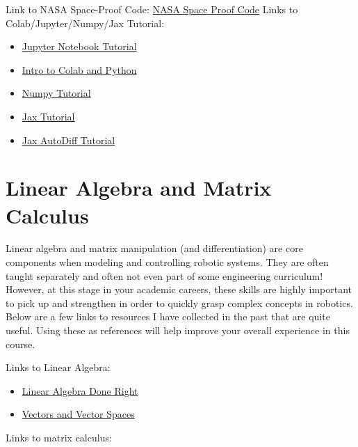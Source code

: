 \documentclass[11pt,letterpaper]{article}
\begin{document}
Link to NASA Space-Proof Code: \href{https://www.youtube.com/watch?v=GWYhtksrmhE}{NASA Space Proof Code}
Links to Colab/Jupyter/Numpy/Jax Tutorial: 
\begin{itemize}
    \item \href{https://www.dataquest.io/blog/jupyter-notebook-tutorial/}{Jupyter Notebook Tutorial}
    \item \href{https://colab.research.google.com/github/tensorflow/examples/blob/master/courses/udacity_intro_to_tensorflow_for_deep_learning/l01c01_introduction_to_colab_and_python.ipynb}{Intro to Colab and Python}
    \item \href{https://numpy.org/doc/stable/user/absolute_beginners.html}{Numpy Tutorial}
    \item \href{https://medium.com/nlplanet/a-quick-intro-to-jax-with-examples-c6e8cc65c3c1}{Jax Tutorial}
    \item \href{https://jax.readthedocs.io/en/latest/notebooks/autodiff_cookbook.html}{Jax AutoDiff Tutorial}
\end{itemize}
\section*{Linear Algebra and Matrix Calculus} 

Linear algebra and matrix manipulation (and differentiation) are core components when modeling and controlling robotic systems. They are often taught separately and often not even part of some engineering curriculum! However, at this stage in your academic careers, these skills are highly important to pick up and strengthen in order to quickly grasp complex concepts in robotics. Below are a few links to resources I have collected in the past that are quite useful. Using these as references will help improve your overall experience in this course. 

Links to Linear Algebra:
\begin{itemize}
    \item \href{https://apuntespme.cl/biblio/AXLER_LINEARALGEBRA.pdf}{Linear Algebra Done Right}
    \item \href{https://www.math.tamu.edu/~dallen/m640_03c/lectures/chapter1.pdf}{Vectors and Vector Spaces}
\end{itemize}

Links to matrix calculus: 
\end{document}
